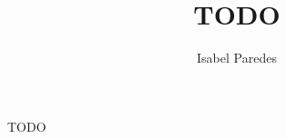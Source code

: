 \documentclass[11pt]{report}
\title{TODO}
\author{Isabel Paredes}
\date{}
\begin{document}
    TODO
\end{document}
